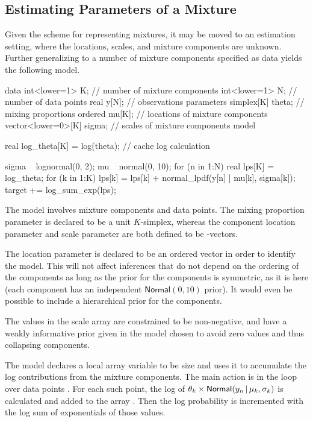 \subsection{Estimating Parameters of a Mixture}

Given the scheme for representing mixtures, it may be moved to an
estimation setting, where the locations, scales, and mixture
components are unknown.  Further generalizing to a number of mixture
components specified as data yields the following model.
%
\begin{stancode}
data {
  int<lower=1> K;          // number of mixture components
  int<lower=1> N;          // number of data points
  real y[N];               // observations
}
parameters {
  simplex[K] theta;          // mixing proportions
  ordered mu[K];             // locations of mixture components
  vector<lower=0>[K] sigma;  // scales of mixture components
}
model {
  real log_theta[K] = log(theta);  // cache log calculation

  sigma ~ lognormal(0, 2);
  mu ~ normal(0, 10);
  for (n in 1:N) {
    real lps[K] = log_theta;
    for (k in 1:K)
      lps[k] = lps[k] + normal_lpdf(y[n] | mu[k], sigma[k]);
    target += log_sum_exp(lps);
  }
}
\end{stancode}
%
The model involves  mixture components and  data
points. The mixing proportion parameter  is declared to be
a unit $K$-simplex, whereas the component location parameter 
and scale parameter  are both defined to be
-vectors.  

The location parameter  is declared to be an ordered vector
in order to identify the model.  This will not affect inferences that
do not depend on the ordering of the components as long as the prior
for the components  is symmetric, as it is here (each
component has an independent $\mathsf{Normal}(0, 10)$ prior).  It
would even be possible to include a hierarchical prior for the components.

The values in the scale array  are constrained to be
non-negative, and have a weakly informative prior given in the model
chosen to avoid zero values and thus collapsing components.  

The model declares a local array variable  to be size
 and uses it to accumulate the log contributions from the
mixture components.  The main action is in the loop over data points
.  For each such point, the log of $\theta_k \times
\distro{Normal}(y_n \, | \, \mu_k,\sigma_k)$ is calculated and added to the
array .  Then the log probability is incremented with the log
sum of exponentials of those values.

